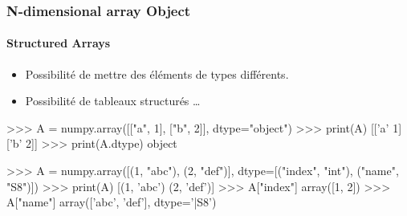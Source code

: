 \begin{frame}[fragile]
\frametitle{N-dimensional array Object}
\framesubtitle{Structured Arrays}
\begin{itemize}
 \item Possibilité de mettre des éléments de types différents.  
 \item Possibilité de tableaux structurés \dots
\end{itemize}
\begin{pythonConsole}
>>> A = numpy.array([["a", 1], ["b", 2]], dtype="object")
>>> print(A)
[['a' 1]
 ['b' 2]]
>>> print(A.dtype)
object

>>> A = numpy.array([(1, "abc"), (2, "def")], dtype=[("index", "int"), 
	("name", "S8")])
>>> print(A)
[(1, 'abc') (2, 'def')]
>>> A["index"]
array([1, 2])
>>> A["name"]
array(['abc', 'def'], 
      dtype='|S8')
\end{pythonConsole}
\end{frame}

